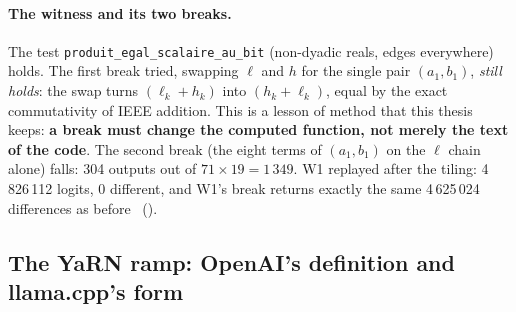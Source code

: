 \paragraph{The witness and its two breaks.} The test \texttt{produit\_egal\_scalaire\_au\_bit} (non-dyadic reals, edges everywhere) holds. The first break tried, swapping $\ell$ and $h$ for the single pair $(a_1, b_1)$, \emph{still holds}: the swap turns $(\ell_k + h_k)$ into $(h_k + \ell_k)$, equal by the exact commutativity of IEEE addition. This is a lesson of method that this thesis keeps: \textbf{a break must change the computed function, not merely the text of the code}. The second break (the eight terms of $(a_1, b_1)$ on the $\ell$ chain alone) falls: 304 outputs out of $71 \times 19 = 1\,349$. W1 replayed after the tiling: 4\,826\,112 logits, 0 different, and W1's break returns exactly the same 4\,625\,024 differences as before \mes~().

\subsection{The YaRN ramp: OpenAI's definition and llama.cpp's form}\label{sec:t2r-yarn}

